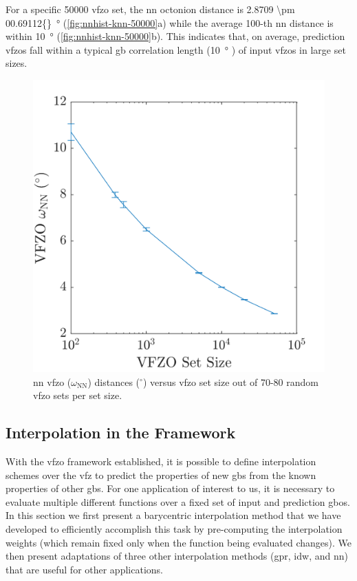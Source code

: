\documentclass[final,twocolumn,12pt]{elsarticle}
\newcommand{\inpt}{input}
\newcommand{\outpt}{prediction}
\newcommand{\nnomega}{2.8709 \pm 00.69112}
\begin{document}
For a specific \num{50000} \gls{vfzo} set, the \gls{nn} octonion distance is \SI{\nnomega{}}{\degree} (\cref{fig:nnhist-knn-50000}a) while the average 100-th \gls{nn} distance is within \SI{10}{\degree} (\cref{fig:nnhist-knn-50000}b). This indicates that, on average, \outpt{} \glspl{vfzo} fall within a typical \gls{gb} correlation length (\SI{10}{\degree} \cite{olmstedSurveyComputedGrain2009}) of \inpt{} \glspl{vfzo} in large set sizes.
\begin{figure}
    \centering
    \includegraphics[scale=1]{nndist-vs-setsize.png}
    \caption{\Gls{nn} \gls{vfzo} ($\omega_{\text{NN}}$) distances ($^{\circ}$) versus \gls{vfzo} set size out of 70-80 random \gls{vfzo} sets per set size.}
    \label{fig:nndist-vs-setsize}
\end{figure}

\subsection{Interpolation in the  Framework}
\label{sec:methods:interp}

With the \gls{vfzo} framework established, it is possible to define interpolation schemes over the \gls{vfz} to predict the properties of new \glspl{gb} from the known properties of other \glspl{gb}. For one application of interest to us, it is necessary to evaluate multiple different functions over a fixed set of \inpt{} and \outpt{} \glspl{gbo}. In this section we first present a barycentric interpolation method that we have developed to efficiently accomplish this task by pre-computing the interpolation weights (which remain fixed only when the function being evaluated changes). We then present adaptations of three other interpolation methods (\gls{gpr}, \gls{idw}, and \gls{nn}) that are useful for other applications. %
\end{document}

